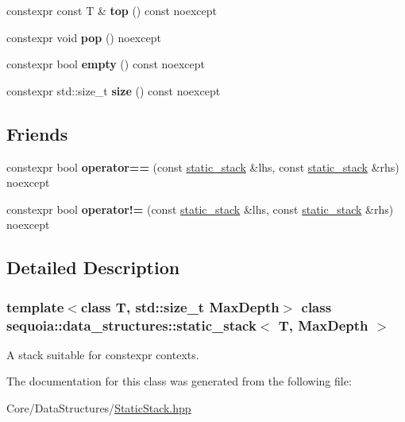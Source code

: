 \begin{DoxyCompactItemize}
constexpr const T \& {\bfseries top} () const noexcept
\item 
\mbox{\label{classsequoia_1_1data__structures_1_1static__stack_ac053b88131511c576bb610d4d1f6f6f2}} 
constexpr void {\bfseries pop} () noexcept
\item 
\mbox{\label{classsequoia_1_1data__structures_1_1static__stack_a1175fa00c7df45c433076b33847a0175}} 
constexpr bool {\bfseries empty} () const noexcept
\item 
\mbox{\label{classsequoia_1_1data__structures_1_1static__stack_ae347f3ffbed4e76b5ec94fdc2a14a253}} 
constexpr std\+::size\+\_\+t {\bfseries size} () const noexcept
\end{DoxyCompactItemize}
\subsection*{Friends}
\begin{DoxyCompactItemize}
\item 
\mbox{\label{classsequoia_1_1data__structures_1_1static__stack_acc0fb4ab3dd0729aba8eefad853fc49c}} 
constexpr bool {\bfseries operator==} (const \mbox{\hyperlink{classsequoia_1_1data__structures_1_1static__stack}{static\+\_\+stack}} \&lhs, const \mbox{\hyperlink{classsequoia_1_1data__structures_1_1static__stack}{static\+\_\+stack}} \&rhs) noexcept
\item 
\mbox{\label{classsequoia_1_1data__structures_1_1static__stack_a477e73a8d47cf03cc64bb4e9e03624ab}} 
constexpr bool {\bfseries operator!=} (const \mbox{\hyperlink{classsequoia_1_1data__structures_1_1static__stack}{static\+\_\+stack}} \&lhs, const \mbox{\hyperlink{classsequoia_1_1data__structures_1_1static__stack}{static\+\_\+stack}} \&rhs) noexcept
\end{DoxyCompactItemize}


\subsection{Detailed Description}
\subsubsection*{template$<$class T, std\+::size\+\_\+t Max\+Depth$>$\newline
class sequoia\+::data\+\_\+structures\+::static\+\_\+stack$<$ T, Max\+Depth $>$}

A stack suitable for constexpr contexts. 

The documentation for this class was generated from the following file\+:\begin{DoxyCompactItemize}
\item 
Core/\+Data\+Structures/\mbox{\hyperlink{_static_stack_8hpp}{Static\+Stack.\+hpp}}\end{DoxyCompactItemize}
